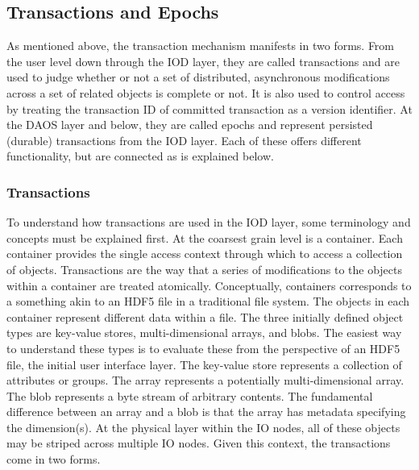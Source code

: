 \documentclass[conference]{IEEEtran}
\newcommand{\DDT}{D\textsuperscript{2}T~}
\newcommand{\DDTns}{D\textsuperscript{2}T}
\begin{document}
\subsection{Transactions and Epochs}
\label{sec:transactions}

As mentioned above, the transaction mechanism manifests in two forms. From the
user level down through the IOD layer, they are called transactions and are
used to judge whether or not a set of distributed, asynchronous modifications
across a set of related objects is complete or not.  It is also used to control
access by treating the transaction ID of committed transaction as a version
identifier.  At the DAOS layer and below, they are called epochs and represent
persisted (durable) transactions from the IOD layer. Each of these offers
different functionality, but are connected as is explained below.

\subsubsection{Transactions}
To understand how transactions are used in the IOD layer, some terminology and
concepts must be explained first. At the coarsest grain level is a container.
Each container provides the single access context through which to access a
collection of objects. Transactions are the way that a series of modifications
to the objects within a container are treated atomically. Conceptually,
containers corresponds to a something akin to an HDF5 file in a traditional
file system. The objects in each container represent different data within a
file.  The three initially defined object types are key-value stores,
multi-dimensional arrays, and blobs.  The easiest way to understand these types
is to evaluate these from the perspective of an HDF5 file, the initial user
interface layer. The key-value store represents a collection of attributes or
groups. The array represents a potentially multi-dimensional array.  The blob
represents a byte stream of arbitrary contents.  The fundamental difference
between an array and a blob is that the array has metadata specifying the
dimension(s). At the physical layer within the IO nodes, all of these objects
may be striped across multiple IO nodes.  Given this context, the transactions
come in two forms.
\end{document}

